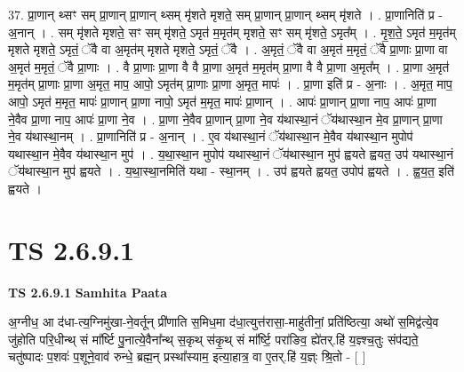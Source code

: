 \documentclass[17pt]{extarticle}
\begin{document}
37. प्रा॒णान् थ्सꣳ सम् प्रा॒णान् प्रा॒णान् थ्सम् मृ॑शते मृशते॒ सम् प्रा॒णान् प्रा॒णान् थ्सम् मृ॑शते । . प्रा॒णानिति॑ प्र - अ॒नान् । . सम् मृ॑शते मृशते॒ सꣳ सम् मृ॑शते॒ ऽमृत॑ म॒मृत॑म् मृशते॒ सꣳ सम् मृ॑शते॒ ऽमृत᳚म् । . मृ॒श॒ते॒ ऽमृत॑ म॒मृत॑म् मृशते मृशते॒ ऽमृतं॒ ॅवै वा अ॒मृत॑म् मृशते मृशते॒ ऽमृतं॒ ॅवै । . अ॒मृतं॒ ॅवै वा अ॒मृत॑ म॒मृतं॒ ॅवै प्रा॒णाः प्रा॒णा वा अ॒मृत॑ म॒मृतं॒ ॅवै प्रा॒णाः । . वै प्रा॒णाः प्रा॒णा वै वै प्रा॒णा अ॒मृत॑ म॒मृत॑म् प्रा॒णा वै वै प्रा॒णा अ॒मृत᳚म् । . प्रा॒णा अ॒मृत॑ म॒मृत॑म् प्रा॒णाः प्रा॒णा अ॒मृत॒ माप॒ आपो॒ ऽमृत॑म् प्रा॒णाः प्रा॒णा अ॒मृत॒ मापः॑ । . प्रा॒णा इति॑ प्र - अ॒नाः । . अ॒मृत॒ माप॒ आपो॒ ऽमृत॑ म॒मृत॒ मापः॑ प्रा॒णान् प्रा॒णा नापो॒ ऽमृत॑ म॒मृत॒ मापः॑ प्रा॒णान् । . आपः॑ प्रा॒णान् प्रा॒णा नाप॒ आपः॑ प्रा॒णा ने॒वैव प्रा॒णा नाप॒ आपः॑ प्रा॒णा ने॒व । . प्रा॒णा ने॒वैव प्रा॒णान् प्रा॒णा ने॒व य॑थास्था॒नं ॅय॑थास्था॒न मे॒व प्रा॒णान् प्रा॒णा ने॒व य॑थास्था॒नम् । . प्रा॒णानिति॑ प्र - अ॒नान् । . ए॒व य॑थास्था॒नं ॅय॑थास्था॒न मे॒वैव य॑थास्था॒न मुपोप॑ यथास्था॒न मे॒वैव य॑थास्था॒न मुप॑ । . य॒था॒स्था॒न मुपोप॑ यथास्था॒नं ॅय॑थास्था॒न मुप॑ ह्वयते ह्वयत॒ उप॑ यथास्था॒नं ॅय॑थास्था॒न मुप॑ ह्वयते । . य॒था॒स्था॒नमिति॑ यथा - स्था॒नम् । . उप॑ ह्वयते ह्वयत॒ उपोप॑ ह्वयते । . ह्व॒य॒त॒ इति॑ ह्वयते । \newline
\pagebreak
{}

\section{ TS 2.6.9.1 }

\textbf{TS 2.6.9.1 } \newline
\textbf{Samhita Paata} \newline

अ॒ग्नीध॒ आ द॑धा-त्य॒ग्निमु॑खा-ने॒वर्तून् प्री॑णाति स॒मिध॒मा द॑धा॒त्युत्त॑रासा॒-माहु॑तीनां॒ प्रति॑ष्ठित्या॒ अथो॑ स॒मिद्व॑त्ये॒व जु॑होति परि॒धीन्थ् सं मा᳚र्ष्टि पु॒नात्ये॒वैना᳚न्थ् स॒कृथ् स॑कृ॒थ् सं मा᳚र्ष्टि॒ परा॑ङिव॒ ह्ये॑तर्.हि॑ य॒ज्ञ्श्च॒तुः संप॑द्यते॒ चतु॑ष्पादः प॒शवः॑ प॒शूने॒वाव॑ रुन्धे॒ ब्रह्म॒न् प्रस्था᳚स्याम॒ इत्या॒हात्र॒ वा ए॒तर्.हि॑ य॒ज्ञ्ः श्रि॒तो - [  ] \newline
\end{document}
